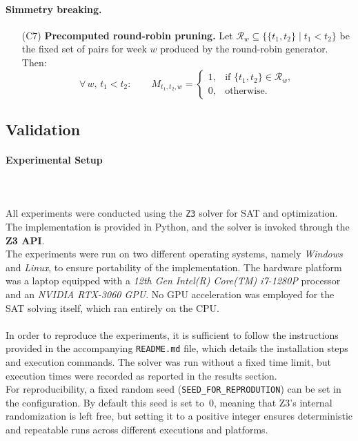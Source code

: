 \documentclass{article}
\begin{document}
\paragraph{Simmetry breaking.}

\begin{itemize}
\item[(C7)] \textbf{Precomputed round-robin pruning.}
Let \(\mathcal{R}_w\subseteq\{\{t_1,t_2\}\mid t_1<t_2\}\) be the fixed set of pairs for week \(w\) produced by the round-robin generator. Then:
\[
\forall\, w,\, t_1<t_2:\qquad
M_{t_1,t_2,w} =
\begin{cases}
1, & \text{if }\{t_1,t_2\}\in \mathcal{R}_w,\\[4pt]
0, & \text{otherwise.}
\end{cases}
\]
\end{itemize}



\subsection{Validation}

\paragraph{Experimental Setup} \mbox{}\\
\\
All experiments were conducted using the \texttt{Z3} solver for SAT and
optimization. The implementation is provided in Python, and the solver is
invoked through the \textbf{Z3 API}. 
\\
The experiments were run on two different operating systems, namely
\emph{Windows} and \emph{Linux}, to ensure portability of the implementation.
The hardware platform was a laptop equipped with a \textit{12th Gen
Intel(R) Core(TM) i7-1280P} processor and an \textit{NVIDIA RTX-3060 GPU}. No GPU
acceleration was employed for the SAT solving itself, which ran entirely on
the CPU.  \\
\\
In order to reproduce the experiments, it is sufficient to follow the
instructions provided in the accompanying \texttt{README.md} file, which
details the installation steps and execution commands. The solver was run
without a fixed time limit, but execution times were recorded as reported in
the results section.
\\
For reproducibility, a fixed random seed (\texttt{SEED\_FOR\_REPRODUTION})
can be set in the configuration. By default this seed is set to~0, meaning
that Z3’s internal randomization is left free, but setting it to a positive
integer ensures deterministic and repeatable runs across different executions
and platforms.
\end{document}
